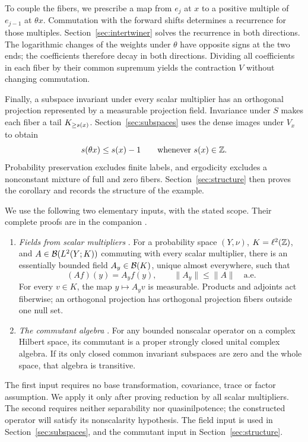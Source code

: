 To couple the fibers, we prescribe a map from $e_j$ at $x$ to a positive
multiple of $e_{j-1}$ at $\theta x$. Commutation with the forward shifts
determines a recurrence for those multiples. Section~\ref{sec:intertwiner}
solves the recurrence in both directions. The logarithmic changes of the
weights under $\theta$ have opposite signs at the two ends; the
coefficients therefore decay in both directions. Dividing all coefficients in each fiber by their common
supremum yields the contraction $V$ without changing commutation.

Finally, a subspace invariant under every scalar multiplier has an
orthogonal projection represented by a measurable projection field.
Invariance under $S$ makes each fiber a tail $K_{\ge s(x)}$.
Section~\ref{sec:subspaces} uses the dense images under $V_x$ to obtain
\[
 s(\theta x)\le s(x)-1\qquad\text{whenever }s(x)\in\mathbb Z.
\]
Probability preservation excludes finite labels, and ergodicity excludes
a nonconstant mixture of full and zero fibers. Section~\ref{sec:structure}
then proves the corollary and records the structure of the example.

We use the following two elementary inputs, with the stated scope.
Their complete proofs are in the companion \cite{CircleCompanion}.
\begin{enumerate}
\item \emph{Fields from scalar multipliers}
\cite[\FieldImportLocator]{CircleCompanion}.
For a probability space $(Y,\nu)$, $K=\ell^2(\mathbb Z)$, and
$A\in\mathcal B(L^2(Y;K))$ commuting with every scalar multiplier,
there is an essentially bounded field $A_y\in\mathcal B(K)$, unique almost
everywhere, such that
\[
 (Af)(y)=A_yf(y),\qquad \|A_y\|\le\|A\|\quad\text{a.e.}
\]
For every $v\in K$, the map $y\mapsto A_yv$ is measurable.
Products and adjoints act fiberwise; an orthogonal projection has
orthogonal projection fibers outside one null set.
\item \emph{The commutant algebra}
\cite[\CommutantImportLocator]{CircleCompanion}.
For any bounded nonscalar operator on a complex Hilbert space, its
commutant is a proper strongly closed unital complex algebra. If its
only closed common invariant subspaces are zero and the whole space,
that algebra is transitive.
\end{enumerate}
The first input requires no base transformation, covariance, trace or
factor assumption. We apply it only after proving reduction by all
scalar multipliers. The second requires neither separability nor
quasinilpotence; the constructed operator will satisfy its nonscalarity
hypothesis. The field input is used in Section~\ref{sec:subspaces}, and the
commutant input in Section~\ref{sec:structure}.
